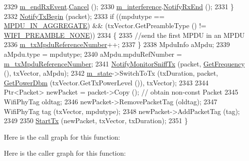 \begin{DoxyCode}
2329       \hyperlink{classns3_1_1WifiPhy_a9a26087e4a13b0a4d82c412e801b139e}{m\_endRxEvent}.\hyperlink{classns3_1_1EventId_a993ae94e48e014e1afd47edb16db7a11}{Cancel} ();
2330       \hyperlink{classns3_1_1WifiPhy_a55909109ad2e2759702336770fa90119}{m\_interference}.\hyperlink{classns3_1_1InterferenceHelper_a4b45bac60d8b7c412236794cf393945d}{NotifyRxEnd} ();
2331     \}
2332   \hyperlink{classns3_1_1WifiPhy_a8a78a3300f20dae6e36b6b871b00e324}{NotifyTxBegin} (packet);
2333   \textcolor{keywordflow}{if} ((mpdutype == \hyperlink{namespacens3_ae617d41bbd0c07fa58ee2306f687b055ac78adeb4fa20b2eefca65601b0b38625}{MPDU\_IN\_AGGREGATE}) && (txVector.GetPreambleType () != 
      \hyperlink{group__wifi_gga5e94a56cb338a14ffbbb19c6a41251eba97c5c71995de5f28931200e6d5a38a66}{WIFI\_PREAMBLE\_NONE}))
2334     \{
2335       \textcolor{comment}{//send the first MPDU in an MPDU}
2336       \hyperlink{classns3_1_1WifiPhy_a65b97f34265cf958696286ddbd0fcb17}{m\_txMpduReferenceNumber}++;
2337     \}
2338   MpduInfo aMpdu;
2339   aMpdu.type = mpdutype;
2340   aMpdu.mpduRefNumber = \hyperlink{classns3_1_1WifiPhy_a65b97f34265cf958696286ddbd0fcb17}{m\_txMpduReferenceNumber};
2341   \hyperlink{classns3_1_1WifiPhy_a0e40477bb60526d46673a809e6b71132}{NotifyMonitorSniffTx} (packet, \hyperlink{classns3_1_1WifiPhy_ad2508d94faf22d690d6b8b4367934fd1}{GetFrequency} (), txVector, aMpdu);
2342   \hyperlink{classns3_1_1WifiPhy_a020dae8902d858e3d121aa7a67ca2528}{m\_state}->SwitchToTx (txDuration, packet, \hyperlink{classns3_1_1WifiPhy_a91fbc9ea51bb2ac6114cad1f70e25af0}{GetPowerDbm} (txVector.GetTxPowerLevel ()), 
      txVector);
2343 
2344   Ptr<Packet> newPacket = packet->Copy (); \textcolor{comment}{// obtain non-const Packet}
2345   WifiPhyTag oldtag;
2346   newPacket->RemovePacketTag (oldtag);
2347   WifiPhyTag tag (txVector, mpdutype);
2348   newPacket->AddPacketTag (tag);
2349 
2350   \hyperlink{classns3_1_1WifiPhy_a01fcffcb00b40a0eef471980d1a5f510}{StartTx} (newPacket, txVector, txDuration);
2351 \}
\end{DoxyCode}


Here is the call graph for this function\+:




Here is the caller graph for this function\+:


